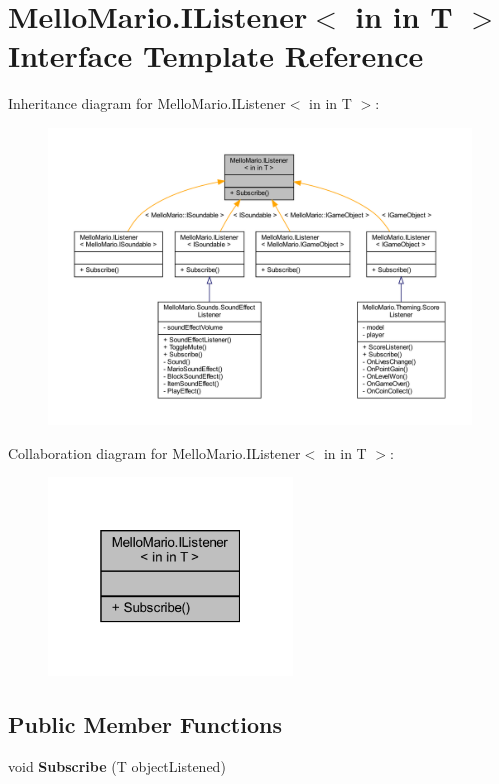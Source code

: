 \section{Mello\+Mario.\+I\+Listener$<$ in in T $>$ Interface Template Reference}
\label{interfaceMelloMario_1_1IListener}


Inheritance diagram for Mello\+Mario.\+I\+Listener$<$ in in T $>$\+:
\nopagebreak
\begin{figure}[H]
\begin{center}
\leavevmode
\includegraphics[width=350pt]{interfaceMelloMario_1_1IListener__inherit__graph}
\end{center}
\end{figure}


Collaboration diagram for Mello\+Mario.\+I\+Listener$<$ in in T $>$\+:
\nopagebreak
\begin{figure}[H]
\begin{center}
\leavevmode
\includegraphics[width=184pt]{interfaceMelloMario_1_1IListener__coll__graph}
\end{center}
\end{figure}
\subsection*{Public Member Functions}
\begin{DoxyCompactItemize}
\item 
void \textbf{ Subscribe} (T object\+Listened)
\end{DoxyCompactItemize}


